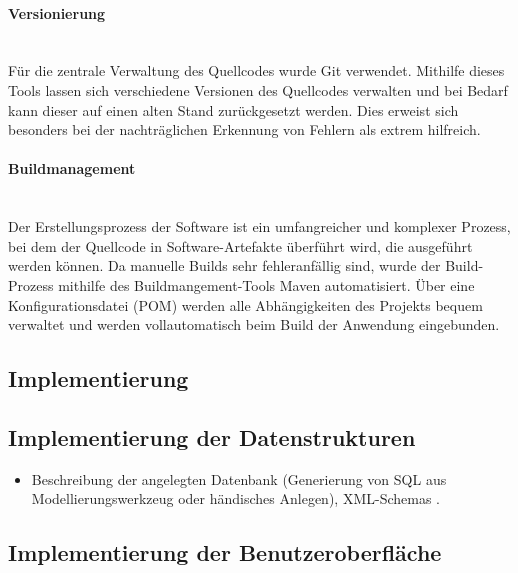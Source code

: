 \paragraph{Versionierung} ~\\
\label{p:Versionierung}
Für die zentrale Verwaltung des Quellcodes wurde Git verwendet. Mithilfe dieses Tools lassen sich verschiedene Versionen des Quellcodes verwalten und bei Bedarf kann dieser auf einen alten Stand zurückgesetzt werden. Dies erweist sich besonders bei der nachträglichen Erkennung von Fehlern als extrem hilfreich.

\paragraph{Buildmanagement} ~\\
\label{p:Buildmangement}
Der Erstellungsprozess der Software ist ein umfangreicher und komplexer Prozess, bei dem der Quellcode in Software-Artefakte überführt wird, die ausgeführt werden können. Da manuelle Builds sehr fehleranfällig sind, wurde der Build-Prozess mithilfe des Buildmangement-Tools Maven automatisiert. Über eine Konfigurationsdatei (\ac{POM}) werden alle Abhängigkeiten des Projekts bequem verwaltet und werden vollautomatisch beim Build der Anwendung eingebunden.


\subsection{Implementierung} 
\label{sec:Implementierung}


\subsection{Implementierung der Datenstrukturen}
\label{sec:ImplementierungDatenstrukturen}

\begin{itemize}
	\item Beschreibung der angelegten Datenbank (\zB Generierung von \acs{SQL} aus Modellierungswerkzeug oder händisches Anlegen), \acs{XML}-Schemas \usw.
\end{itemize}


\subsection{Implementierung der Benutzeroberfläche}
\label{sec:ImplementierungBenutzeroberflaeche}


